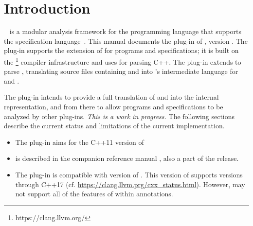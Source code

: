 \chapter{Introduction}

\framac~\cite{userman,fac15} is a modular analysis framework for the \C
programming language that supports the \acsl specification
language~\cite{acsl}. This manual documents the \fclang plug-in of \framac,
version \fclangversion. 
The \fclang plug-in supports the \acslpp extension of \acsl for \cpp programs and specifications; 
it is built on the \clang\footnote{https://clang.llvm.org/} compiler infrastructure and uses \clang for 
parsing C++. The plug-in extends \clang to parse \acslpp, translating source files containing \cpp and \acslpp into \framac's intermediate language for \C and \acsl.

The \fclang plug-in intends to provide a full translation of \cpp and \acslpp into the \framac internal representation, and from there to allow \cpp programs and \acslpp specifications to be analyzed by other \framac plug-ins. 
\textit{This is a work in progress.}
The following sections describe the current status and limitations of the current implementation.
\begin{itemize}
	\item The plug-in aims for the C++11 version of \cpp
	\item \acslpp is described in the companion \acslpp reference manual \cite{acslpp}, also a part of the \framac release.
    \item The plug-in is compatible with version \clangversion of \clang. 
    This version of \clang supports \cpp versions through C++17 
    (cf. \url{https://clang.llvm.prg/cxx_status.html}). 
    However, \fclang may not support all of the features of \cpp within annotations.
\end{itemize}
